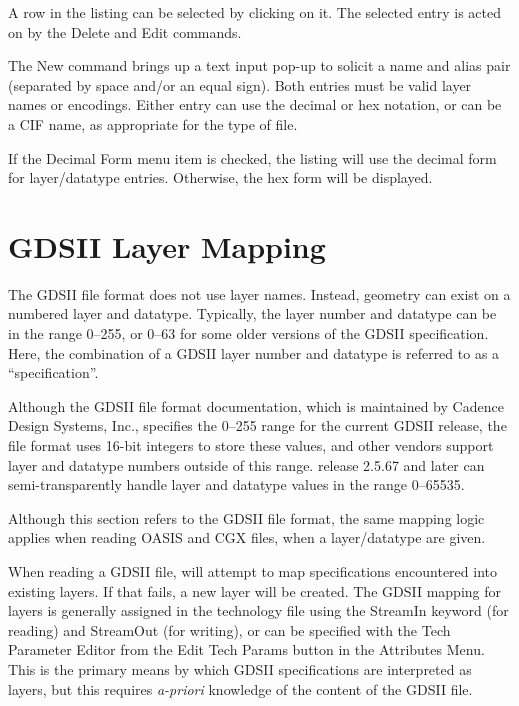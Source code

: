 \begin{description}
A row in the listing can be selected by clicking on it.  The selected
entry is acted on by the {\cb Delete} and {\cb Edit} commands.

The {\cb New} command brings up a text input pop-up to solicit a name
and alias pair (separated by space and/or an equal sign).  Both
entries must be valid layer names or encodings.  Either entry can use
the decimal or hex notation, or can be a CIF name, as appropriate for
the type of file.

If the {\cb Decimal Form} menu item is checked, the listing will use
the decimal form for layer/datatype entries.  Otherwise, the hex form
will be displayed.
\end{description}


\section{GDSII Layer Mapping}
\label{gdslayer}

The GDSII file format does not use layer names.  Instead, geometry
can exist on a numbered layer and datatype.  Typically, the layer
number and datatype can be in the range 0--255, or 0--63 for some
older versions of the GDSII specification.  Here, the combination
of a GDSII layer number and datatype is referred to as a
``specification''.

Although the GDSII file format documentation, which is maintained by
Cadence Design Systems, Inc., specifies the 0--255 range for the
current GDSII release, the file format uses 16-bit integers to store
these values, and other vendors support layer and datatype numbers
outside of this range.  {\Xic} release 2.5.67 and later can
semi-transparently handle layer and datatype values in the range
0--65535.

Although this section refers to the GDSII file format, the same
mapping logic applies when reading OASIS and CGX files, when a
layer/datatype are given.

When reading a GDSII file, {\Xic} will attempt to map specifications
encountered into existing {\Xic} layers.  If that fails, a new {\Xic}
layer will be created.  The GDSII mapping for {\Xic} layers is
generally assigned in the technology file using the {\et StreamIn}
keyword (for reading) and {\et StreamOut} (for writing), or can be
specified with the {\cb Tech Parameter Editor} from the {\cb Edit Tech
Params} button in the {\cb Attributes Menu}.  This is the primary
means by which GDSII specifications are interpreted as {\Xic} layers,
but this requires {\it a-priori} knowledge of the content of the GDSII
file.

